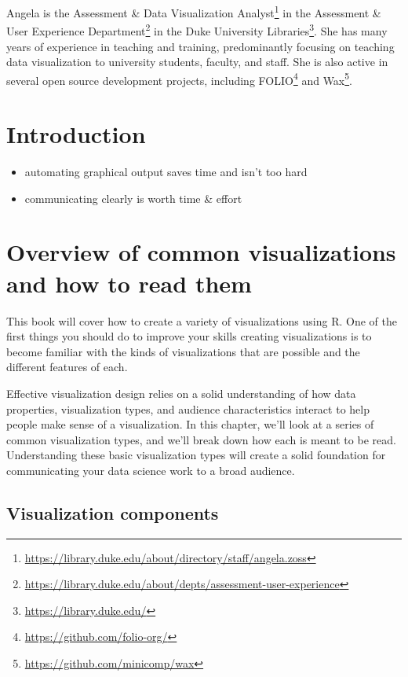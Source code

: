 \documentclass[
]{krantz}
\providecommand{\tightlist}{%
  \setlength{\itemsep}{0pt}\setlength{\parskip}{0pt}}
\renewcommand{\href}[2]{#2\footnote{\url{#1}}}
\begin{document}
Angela is the \href{https://library.duke.edu/about/directory/staff/angela.zoss}{Assessment \& Data Visualization Analyst} in the \href{https://library.duke.edu/about/depts/assessment-user-experience}{Assessment \& User Experience Department} in the \href{https://library.duke.edu/}{Duke University Libraries}. She has many years of experience in teaching and training, predominantly focusing on teaching data visualization to university students, faculty, and staff. She is also active in several open source development projects, including \href{https://github.com/folio-org/}{FOLIO} and \href{https://github.com/minicomp/wax}{Wax}.

\hypertarget{introduction}{%
\chapter*{Introduction}\label{introduction}}


\begin{itemize}
\tightlist
\item
  automating graphical output saves time and isn't too hard
\item
  communicating clearly is worth time \& effort
\end{itemize}

\mainmatter

\hypertarget{reading-visualizations}{%
\chapter{Overview of common visualizations and how to read them}\label{reading-visualizations}}

This book will cover how to create a variety of visualizations using R. One of the
first things you should do to improve your skills creating visualizations is to
become familiar with the kinds of visualizations that are possible and the different
features of each.

Effective visualization design relies on a solid understanding
of how data properties, visualization types, and audience characteristics interact
to help people make sense of a visualization. In this chapter, we'll look at
a series of common visualization types, and we'll break down how each is meant to
be read. Understanding these basic visualization types will create a solid foundation for
communicating your data science work to a broad audience.

\hypertarget{visualization-components}{%
\section{Visualization components}\label{visualization-components}}
\end{document}
